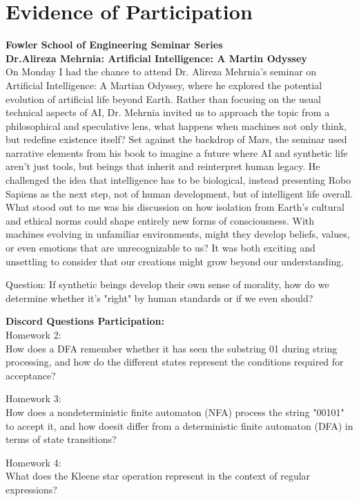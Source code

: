 \documentclass{article}
\theoremstyle{theorem}
\theoremstyle{definition}
\theoremstyle{remark}
\begin{document}
\section{Evidence of Participation}
\textbf{Fowler School of Engineering Seminar Series} \\
\textbf{Dr.Alireza Mehrnia: Artificial Intelligence: A Martin Odyssey} \\
On Monday I had the chance to attend Dr. Alireza Mehrnia’s seminar on Artificial Intelligence: A Martian Odyssey, where he explored the potential evolution of artificial life beyond Earth. Rather than focusing on the usual technical aspects of AI, Dr. Mehrnia invited us to approach the topic from a philosophical and speculative lens, what happens when machines not only think, but redefine existence itself? Set against the backdrop of Mars, the seminar used narrative elements from his book to imagine a future where AI and synthetic life aren’t just tools, but beings that inherit and reinterpret human legacy. He challenged the idea that intelligence has to be biological, instead presenting Robo Sapiens as the next step, not of human development, but of intelligent life overall. What stood out to me was his discussion on how isolation from Earth’s cultural and ethical norms could shape entirely new forms of consciousness. With machines evolving in unfamiliar environments, might they develop beliefs, values, or even emotions that are unrecognizable to us? It was both exciting and unsettling to consider that our creations might grow beyond our understanding.

Question: If synthetic beings develop their own sense of morality, how do we determine whether it's "right" by human standards or if we even should?

\textbf{Discord Questions Participation:}\\
Homework 2: \\
How does a DFA remember whether it has seen the substring 01 during string processing, and how do the different states represent the conditions required for acceptance?

Homework 3: \\
How does a nondeterministic finite automaton (NFA) process the string "00101" to accept it, and how doesit differ from a deterministic finite automaton (DFA) in terms of state transitions?

Homework 4: \\
What does the Kleene star operation represent in the context of regular expressions?
\end{document}
